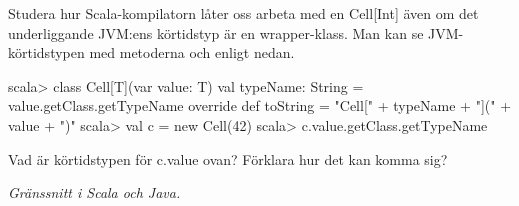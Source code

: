 \Subtask Studera hur Scala-kompilatorn låter oss arbeta med en Cell[Int] även om det underliggande JVM:ens körtidstyp  är en wrapper-klass. Man kan se JVM-körtidstypen med metoderna  och  enligt nedan.
\begin{REPL}
scala> class Cell[T](var value: T){
         val typeName: String = value.getClass.getTypeName
         override def toString = "Cell[" + typeName + "](" + value + ")"
       }
scala> val c = new Cell(42)
scala> c.value.getClass.getTypeName
\end{REPL}

\Subtask Vad är körtidstypen för c.value ovan? Förklara hur det kan komma sig? 


\Subtask 

\ExtraTasks %

\TODO
\Task     


\AdvancedTasks %

\TODO 
\Task \emph{Gränssnitt i Scala och Java.} 


    